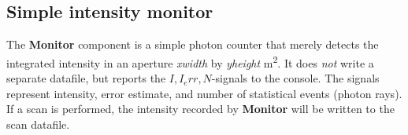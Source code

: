 \subsection*{Simple intensity monitor}
The \textbf{Monitor} component is a simple photon counter that merely detects the integrated
intensity in an aperture \textit{xwidth} by \textit{yheight} \si{\metre\squared}. It does \emph{not} write
a separate datafile, but reports the $I, I_err, N$-signals to the console. The signals represent
 intensity, error estimate, and number of statistical events (photon rays). If a scan is performed, the intensity recorded by \textbf{Monitor}
will be written to the scan datafile.
